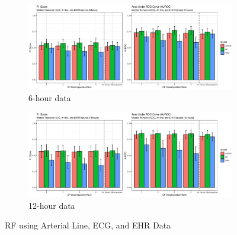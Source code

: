 \begin{figure}[htb]
    \centering
    \begin{subfigure}[htb]{\textwidth}
        \includegraphics[width=\textwidth]{body/figures/all_6.eps}
        \caption{6-hour data}
    \end{subfigure}
    \hfill
    \begin{subfigure}[htb]{\textwidth}
        \includegraphics[width=\textwidth]{body/figures/all_12.eps}
        \caption{12-hour data}
    \end{subfigure}
    \caption{RF using Arterial Line, ECG, and EHR Data}
    \label{fig:sigEHR}
\end{figure}  %

\clearpage